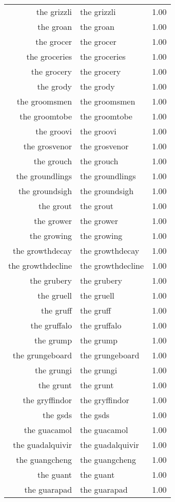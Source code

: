 \begin{table}[ht]
\begin{tabular}{rlr}
  the grizzli & the grizzli & 1.00 \\ 
  the groan & the groan & 1.00 \\ 
  the grocer & the grocer & 1.00 \\ 
  the groceries & the groceries & 1.00 \\ 
  the grocery & the grocery & 1.00 \\ 
  the grody & the grody & 1.00 \\ 
  the groomsmen & the groomsmen & 1.00 \\ 
  the groomtobe & the groomtobe & 1.00 \\ 
  the groovi & the groovi & 1.00 \\ 
  the grosvenor & the grosvenor & 1.00 \\ 
  the grouch & the grouch & 1.00 \\ 
  the groundlings & the groundlings & 1.00 \\ 
  the groundsigh & the groundsigh & 1.00 \\ 
  the grout & the grout & 1.00 \\ 
  the grower & the grower & 1.00 \\ 
  the growing & the growing & 1.00 \\ 
  the growthdecay & the growthdecay & 1.00 \\ 
  the growthdecline & the growthdecline & 1.00 \\ 
  the grubery & the grubery & 1.00 \\ 
  the gruell & the gruell & 1.00 \\ 
  the gruff & the gruff & 1.00 \\ 
  the gruffalo & the gruffalo & 1.00 \\ 
  the grump & the grump & 1.00 \\ 
  the grungeboard & the grungeboard & 1.00 \\ 
  the grungi & the grungi & 1.00 \\ 
  the grunt & the grunt & 1.00 \\ 
  the gryffindor & the gryffindor & 1.00 \\ 
  the gsds & the gsds & 1.00 \\ 
  the guacamol & the guacamol & 1.00 \\ 
  the guadalquivir & the guadalquivir & 1.00 \\ 
  the guangcheng & the guangcheng & 1.00 \\ 
  the guant & the guant & 1.00 \\ 
  the guarapad & the guarapad & 1.00 \\ 

\end{tabular}
\end{table}
